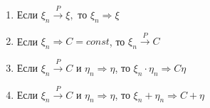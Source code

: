 \begin{theorem}
	\hspace{0pt}
	\begin{enumerate}
		\item Если $\xi_n\stackrel{P}{\to}\xi,$ то $\xi_n\Rightarrow\xi$
		\item Если $\xi_n\Rightarrow C=const$, то $\xi_n \stackrel{P}{\to} C$
		\item Если $\xi_n\stackrel{P}{\to} C$ и $\eta_n\Rightarrow\eta$, то $\xi_n\cdot\eta_n\Rightarrow C\eta$
		\item Если $\xi_n\stackrel{P}{\to} C$ и $\eta_n\Rightarrow\eta$, то $\xi_n+\eta_n\Rightarrow C+\eta$
	\end{enumerate}
\end{theorem}